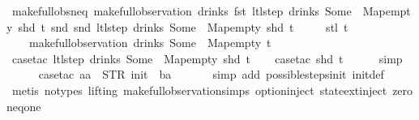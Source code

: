 \begin{isabellebody}
\isamarkupfalse%
\ make{\isacharunderscore}full{\isacharunderscore}obs{\isacharunderscore}neq{\isacharcolon}\ {\isachardoublequoteopen}make{\isacharunderscore}full{\isacharunderscore}observation\ drinks\ {\isacharparenleft}fst\ {\isacharparenleft}ltl{\isacharunderscore}step\ drinks\ {\isacharparenleft}Some\ {}{\isacharparenright}\ Map{\isachardot}empty\ {\isacharparenleft}shd\ t{\isacharparenright}{\isacharparenright}{\isacharparenright}\ {\isacharparenleft}snd\ {\isacharparenleft}snd\ {\isacharparenleft}ltl{\isacharunderscore}step\ drinks\ {\isacharparenleft}Some\ {}{\isacharparenright}\ Map{\isachardot}empty\ {\isacharparenleft}shd\ t{\isacharparenright}{\isacharparenright}{\isacharparenright}{\isacharparenright}\isanewline
\ \ \ \ \ {\isacharparenleft}stl\ t{\isacharparenright}\ {\isasymnoteq}\isanewline
\ \ \ \ make{\isacharunderscore}full{\isacharunderscore}observation\ drinks\ {\isacharparenleft}Some\ {}{\isacharparenright}\ Map{\isachardot}empty\ t{\isachardoublequoteclose}\isanewline
%
\isadelimproof
\ \ %
\endisadelimproof
%
\isatagproof
{}\isamarkupfalse%
\ {\isacharparenleft}case{\isacharunderscore}tac\ {\isachardoublequoteopen}ltl{\isacharunderscore}step\ drinks\ {\isacharparenleft}Some\ {}{\isacharparenright}\ Map{\isachardot}empty\ {\isacharparenleft}shd\ t{\isacharparenright}{\isachardoublequoteclose}{\isacharparenright}\isanewline
\ \ \isamarkupfalse%
\ {\isacharparenleft}case{\isacharunderscore}tac\ {\isachardoublequoteopen}shd\ t{\isachardoublequoteclose}{\isacharparenright}\isanewline
\ \ \ \ \isamarkupfalse%
\ simp\isanewline
\ \ \ \ \isamarkupfalse%
\ {\isacharparenleft}case{\isacharunderscore}tac\ {\isachardoublequoteopen}aa\ {\isacharequal}\ STR\ {\isacharprime}{\isacharprime}init{\isacharprime}{\isacharprime}\ {\isasymand}\ ba\ {\isacharequal}\ {\isacharbrackleft}{\isacharbrackright}{\isachardoublequoteclose}{\isacharparenright}\isanewline
\ \ \ \isamarkupfalse%
\ {\isacharparenleft}simp\ add{\isacharcolon}\ possible{\isacharunderscore}steps{\isacharunderscore}init\ init{\isacharunderscore}def{\isacharparenright}\isanewline
\ \ \isamarkupfalse%
\ {\isacharparenleft}metis\ {\isacharparenleft}no{\isacharunderscore}types{\isacharcomma}\ lifting{\isacharparenright}\ make{\isacharunderscore}full{\isacharunderscore}observation{\isachardot}simps{\isacharparenleft}{}{\isacharparenright}\ option{\isachardot}inject\ state{\isachardot}ext{\isacharunderscore}inject\ zero{\isacharunderscore}neq{\isacharunderscore}one{\isacharparenright}\isanewline

\end{isabellebody}
